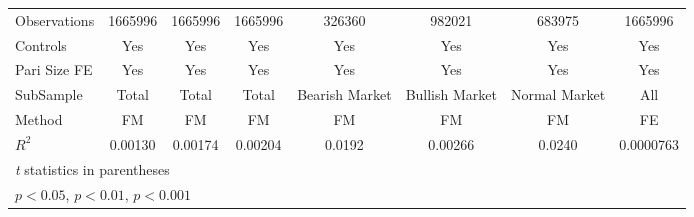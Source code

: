 {\begin{tabular}{l*{7}{c}}
\hline
Observations    &  1665996         &  1665996         &  1665996         &   326360         &   982021         &   683975         &  1665996         \\
Controls        &      Yes         &      Yes         &      Yes         &      Yes         &      Yes         &      Yes         &      Yes         \\
Pari Size FE    &      Yes         &      Yes         &      Yes         &      Yes         &      Yes         &      Yes         &      Yes         \\
SubSample       &    Total         &    Total         &    Total         &Bearish Market         &Bullish Market         &Normal Market         &      All         \\
Method          &       FM         &       FM         &       FM         &       FM         &       FM         &       FM         &       FE         \\
$ R^2$          &  0.00130         &  0.00174         &  0.00204         &   0.0192         &  0.00266         &   0.0240         &0.0000763         \\
\hline\hline
\multicolumn{8}{l}{\footnotesize \textit{t} statistics in parentheses}\\
\multicolumn{8}{l}{\footnotesize \sym{*} \(p<0.05\), \sym{**} \(p<0.01\), \sym{***} \(p<0.001\)}\\
\end{tabular}
}
